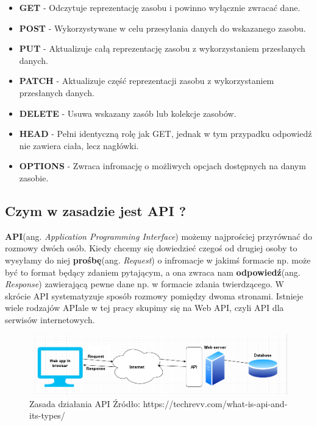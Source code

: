 \documentclass[oneside,polski,logo,indent]{amuthesis}
\begin{document}
\begin{itemize}
\item \textbf{GET} - Odczytuje reprezentację zasobu i powinno wyłącznie zwracać dane.
\item \textbf{POST} - Wykorzystywane w celu przesyłania danych do wskazanego zasobu.
\item \textbf{PUT} - Aktualizuje całą reprezentację zasobu z wykorzystaniem przesłanych danych.
\item \textbf{PATCH} - Aktualizuje część reprezentacji zasobu z wykorzystaniem przesłanych danych.
\item \textbf{DELETE} - Usuwa wskazany zasób lub kolekcje zasobów.
\item \textbf{HEAD} - Pełni identyczną rolę jak GET, jednak w tym przypadku odpowiedź nie zawiera ciała, lecz nagłówki.
\item \textbf{OPTIONS} - Zwraca infromację o możliwych opcjach dostępnych na danym zasobie.
\end{itemize}

\begin{center}
\subsection{Czym w zasadzie jest API ?}
\end{center}
\textbf{API}(ang. \emph{Application Programming Interface}) możemy najprościej przyrównać do rozmowy dwóch osób. Kiedy chcemy się dowiedzieć czegoś od drugiej osoby to wysyłamy do niej \textbf{prośbę}(ang. \emph{Request}) o infromacje w jakimś formacie np. może być to format będący zdaniem pytającym, a ona zwraca nam \textbf{odpowiedź}(ang. \emph{Response}) zawierającą pewne dane np. w formacie zdania twierdzącego. W skrócie API systematyzuje sposób rozmowy pomiędzy dwoma stronami. Istnieje wiele rodzajów API\break ale w tej pracy skupimy się na Web API, czyli API dla serwisów internetowych. 

\begin{figure}[H]
\centering
\includegraphics[width=14cm]{api.png}
\caption{Zasada działania API\newline
Źródło: https://techrevv.com/what-is-api-and-its-types/}
\label{Cache}
\end{figure}
\end{document}
